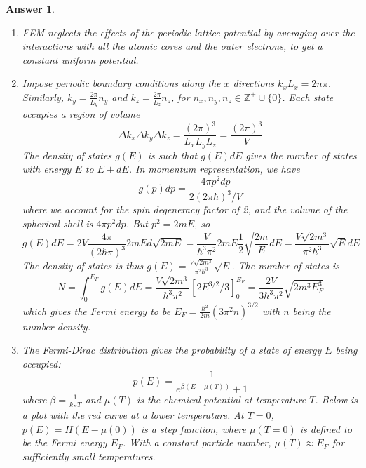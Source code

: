 \documentclass[a4paper]{article}
\newtheorem{ans}{Answer}[subsection]
\theoremstyle{new}
\begin{document}
\begin{ans}\leavevmode
\begin{enumerate}[label=(\alph*)]
\item FEM neglects the effects of the periodic lattice potential by averaging over the interactions with all the atomic cores and the outer electrons, to get a constant uniform potential.
\item Impose periodic boundary conditions along the $x$ directions $k_xL_x=2n\pi$. Similarly, $k_y=\frac{2\pi}{L_y}n_y$ and $k_z=\frac{2\pi}{L_z}n_z$, for $n_x,n_y,n_z\in\mathbb{Z}^+\cup\{0\}$. Each state occupies a region of volume 
$$\Delta k_x\Delta k_y\Delta k_z=\frac{(2\pi)^3}{L_xL_yL_z}=\frac{(2\pi)^3}{V}$$
The density of states $g(E)$ is such that $g(E)dE$ gives the number of states with energy $E$ to $E+dE$. In momentum representation, we have
$$g(p)dp=\frac{4\pi p^2dp}{2(2\pi\hbar)^3/V}$$
where we account for the spin degeneracy factor of 2, and the volume of the spherical shell is $4\pi p^2dp$. But $p^2=2mE$, so
$$g(E)dE=2V\frac{4\pi}{(2\hbar\pi)^3}2mEd\sqrt{2mE}=\frac{V}{\hbar^3\pi^2}2mE\frac{1}{2}\sqrt{\frac{2m}{E}}dE=\frac{V\sqrt{2m^3}}{\pi^2\hbar^3}\sqrt{E}dE$$
The density of states is thus $g(E)=\frac{V\sqrt{2m^3}}{\pi^2\hbar^3}\sqrt{E}$. The number of states is
$$N=\int_0^{E_F}g(E)dE=\frac{V\sqrt{2m^3}}{\hbar^3\pi^2}[2E^{3/2}/3]_0^{E_F}=\frac{2V}{3\hbar^3\pi^2}\sqrt{2m^3E_F^3}$$
which gives the Fermi energy to be $E_F=\frac{\hbar^2}{2m}(3\pi^2n)^{3/2}$ with $n$ being the number density.
\item The Fermi-Dirac distribution gives the probability of a state of energy $E$ being occupied:
$$p(E)=\frac{1}{e^{\beta(E-\mu(T))}+1}$$
where $\beta=\frac{1}{k_BT}$ and $\mu(T)$ is the chemical potential at temperature $T$. Below is a plot with the red curve at a lower temperature. At $T=0$, $p(E)=H(E-\mu(0))$ is a step function, where $\mu(T=0)$ is defined to be the Fermi energy $E_F$. With a constant particle number, $\mu(T)\approx E_F$ for sufficiently small temperatures.
\begin{center}

\end{center}
\end{enumerate}
\end{ans}
\end{document}
